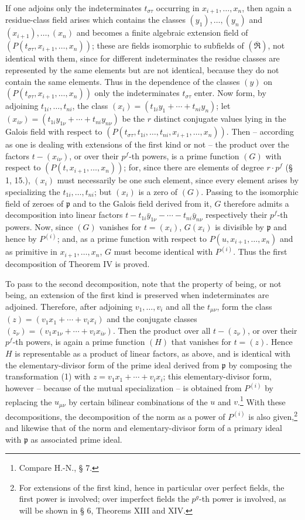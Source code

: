 \documentclass[11pt]{article}
\providecommand{\mR}{\mathfrak{R}}
\providecommand{\frakp}{\mathfrak p}
\providecommand{\mR}{\mathfrak{R}}
\providecommand{\frakp}{\mathfrak p}
\providecommand{\frakp}{\mathfrak p}
\begin{document}
If one adjoins only the indeterminates $t_{\sigma\tau}$ occurring in $x_{i+1},\ldots,x_n$, then again a residue-class field arises which contains the classes $(y_1),\ldots,(y_n)$ and $(x_{i+1}),\ldots,(x_n)$ and becomes a finite algebraic extension field of $(P(t_{\sigma\tau},x_{i+1},\ldots,x_n))$; these are fields isomorphic to subfields of $(\bar{\mR})$, not identical with them, since for different indeterminates the residue classes are represented by the same elements but are not identical, because they do not contain the same elements. Thus in the dependence of the classes $(y)$ on $(P(t_{\sigma\tau},x_{i+1},\ldots,x_n))$ only the indeterminates $t_{\sigma\tau}$ enter. Now form, by adjoining $t_{1i},\ldots,t_{ni}$, the class $(x_i)=(t_{1i}y_1+\cdots+t_{ni}y_n)$; let $(x_{i\nu})=(t_{1i}y_{1\nu}+\cdots+t_{ni}y_{n\nu})$ be the $r$ distinct conjugate values lying in the Galois field with respect to $(P(t_{\sigma\tau},t_{1i},\ldots,t_{ni},x_{i+1},\ldots,x_n))$. Then -- according as one is dealing with extensions of the first kind or not -- the product over the factors $t-(x_{i\nu})$, or over their $p^f$-th powers, is a prime function $(G)$ with respect to $(P(t,x_{i+1},\ldots,x_n))$; for, since there are elements of degree $r\cdot p^f$ (§ 1, 15.), $(x_i)$ must necessarily be one such element, since every element arises by specializing the $t_{1i},\ldots,t_{ni}$; but $(x_i)$ is a zero of $(G)$. Passing to the isomorphic field of zeroes of $\frakp$ and to the Galois field derived from it, $G$ therefore admits a decomposition into linear factors $t-t_{1i}\bar y_{1\nu}-\cdots-t_{ni}\bar y_{n\nu}$ respectively their $p^f$-th powers. Now, since $(G)$ vanishes for $t=(x_i)$, $G(x_i)$ is divisible by $\frakp$ and hence by $P^{(i)}$; and, as a prime function with respect to $P(u,x_{i+1},\ldots,x_n)$ and as primitive in $x_{i+1},\ldots,x_n$, $G$ must become identical with $P^{(i)}$. Thus the first decomposition of Theorem IV is proved.

To pass to the second decomposition, note that the property of being, or not being, an extension of the first kind is preserved when indeterminates are adjoined. Therefore, after adjoining $v_1,\ldots,v_i$ and all the $t_{\mu\nu}$, form the class $(z)=(v_1x_1+\cdots+v_ix_i)$ and the conjugate classes $(z_\nu)=(v_1x_{1\nu}+\cdots+v_ix_{i\nu})$. Then the product over all $t-(z_\nu)$, or over their $p^f$-th powers, is again a prime function $(H)$ that vanishes for $t=(z)$. Hence $H$ is representable as a product of linear factors, as above, and is identical with the elementary-divisor form of the prime ideal derived from $\frakp$ by composing the transformation (1) with $z=v_1x_1+\cdots+v_ix_i$; this elementary-divisor form, however -- because of the mutual specialization -- is obtained from $P^{(i)}$ by replacing the $u_{\mu\nu}$ by certain bilinear combinations of the $u$ and $v$.\footnote{Compare H.-N., § 7.} With these decompositions, the decomposition of the norm as a power of $P^{(i)}$ is also given,\footnote{For extensions of the first kind, hence in particular over perfect fields, the first power is involved; over imperfect fields the $p^g$-th power is involved, as will be shown in § 6, Theorems XIII and XIV.} and likewise that of the norm and elementary-divisor form of a primary ideal with $\frakp$ as associated prime ideal.
\end{document}
